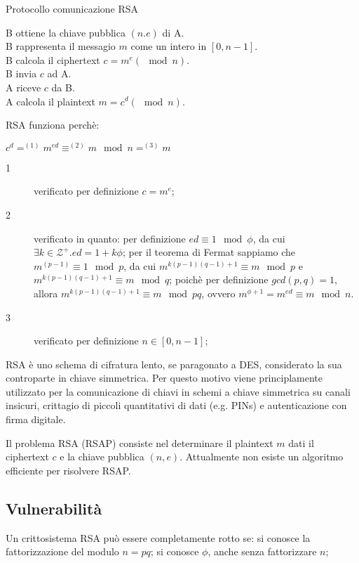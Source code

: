 \bigskip
\begin{algorithm}[H]
  \SetAlgoNoLine
  \caption{Protocollo comunicazione RSA}
  \label{alg:rsa-protocol}
  B ottiene la chiave pubblica $(n.e)$ di A. \\
  B rappresenta il messagio $m$ come un intero in $[0,n-1]$. \\
  B calcola il ciphertext $c=m^{e}(\mod n)$. \\
  B invia $c$ ad A. \\
  A riceve $c$ da B. \\
  A calcola il plaintext $m=c^{d}(\mod n)$.
\end{algorithm}

RSA funziona perchè:

$c^{d} =^{(1)} m^{ed} \equiv^{(2)} m \mod n =^{(3)} m$

\begin{description}
  \item[1] verificato per definizione $c=m^{e}$;

  \item[2] verificato in quanto:
    per definizione $ed\equiv 1 \mod \phi$, da cui $\exists k \in \mathcal{Z^{+}}.ed=1+k\phi$;
    per il teorema di Fermat sappiamo che $m^{(p-1)} \equiv 1 \mod p$, da cui $m^{k(p-1)(q-1)+1} \equiv m \mod p$ e $m^{k(p-1)(q-1)+1} \equiv m \mod q$;
    poichè per definizione $gcd(p,q)=1$, allora $m^{k(p-1)(q-1)+1} \equiv m \mod pq$, ovvero $m^{\phi +1} = m^{ed} \equiv m \mod n$.

  \item[3] verificato per definizione $n \in [0,n-1]$;
\end{description}

RSA è uno schema di cifratura lento, se paragonato a DES, considerato la sua controparte in chiave simmetrica. Per questo motivo viene principlamente utilizzato per la comunicazione di chiavi in schemi a chiave simmetrica su canali insicuri, crittagio di piccoli quantitativi di dati (e.g. PINs) e autenticazione con firma digitale.


Il problema RSA (RSAP) consiste nel determinare il plaintext $m$ dati il ciphertext $c$ e la chiave pubblica $(n,e)$. Attualmente non esiste un algoritmo efficiente per risolvere RSAP.

\subsection{Vulnerabilità}
Un crittosistema RSA può essere completamente rotto se:
si conosce la fattorizzazione del modulo $n=pq$;
si conosce $\phi$, anche senza fattorizzare $n$;

